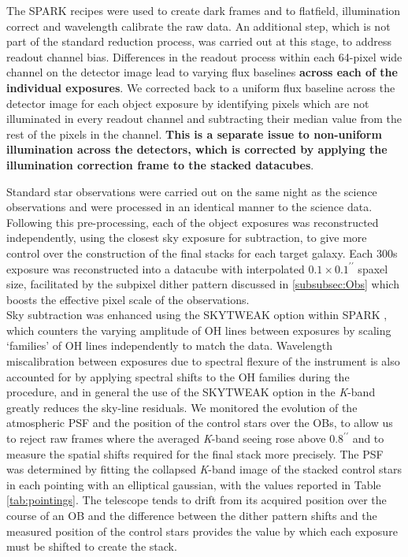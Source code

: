 \documentclass[fleqn,usenatbib]{mnras}
\begin{document}
The SPARK recipes were used to create dark frames and to flatfield, illumination correct and wavelength calibrate the raw data.
An additional step, which is not part of the standard reduction process, was carried out at this stage, to address readout channel bias.
Differences in the readout process within each 64-pixel wide channel on the detector image lead to varying flux baselines \textbf{across each of the individual exposures}.
We corrected back to a uniform flux baseline across the detector image for each object exposure by identifying pixels which are not illuminated in every readout channel and subtracting their median value from the rest of the pixels in the channel.
\textbf{This is a separate issue to non-uniform illumination across the detectors, which is corrected by applying the illumination correction frame to the stacked datacubes}.


Standard star observations were carried out on the same night as the science observations and were processed in an identical manner to the science data.
Following this pre-processing, each of the object exposures was reconstructed independently, using the closest sky exposure for subtraction, to give more control over the construction of the final stacks for each target galaxy.
Each 300s exposure was reconstructed into a datacube with interpolated $0.1\times0.1^{\prime\prime}$ spaxel size, facilitated by the subpixel dither pattern discussed in \cref{subsubsec:Obs} which boosts the effective pixel scale of the observations. \\


Sky subtraction was enhanced using the SKYTWEAK option within SPARK \citep{Davies2007}, which counters the varying amplitude of OH lines between exposures by scaling `families' of OH lines independently to match the data.
Wavelength miscalibration between exposures due to spectral flexure of the instrument is also accounted for by applying spectral shifts to the OH families during the procedure, and in general the use of the SKYTWEAK option in the {\it K}-band greatly reduces the sky-line residuals. 
We monitored the evolution of the atmospheric PSF and the position of the control stars over the OBs, to allow us to reject raw frames where the averaged {\it K}-band seeing rose above $0.8^{\prime\prime}$ and to measure the spatial shifts required for the final stack more precisely.
The PSF was determined by fitting the collapsed {\it K}-band image of the stacked control stars in each pointing with an elliptical gaussian, with the values reported in Table \ref{tab:pointings}.
The telescope tends to drift from its acquired position over the course of an OB and the difference between the dither pattern shifts and the measured position of the control stars provides the value by which each exposure must be shifted to create the stack. \\
\end{document}
